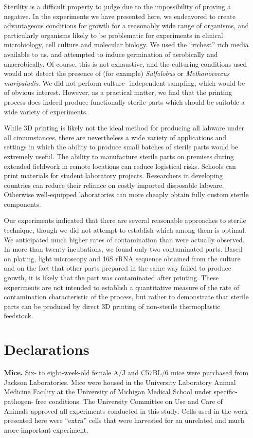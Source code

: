 \documentclass[fleqn,10pt]{wlpeerj}
\begin{document}
Sterility is a difficult property to judge due to the impossibility of proving
a negative. In the experiments we have presented here, we endeavored to create
advantageous conditions for growth for a reasonably wide range of organisms,
and particularly organisms likely to be problematic for experiments in
clinical microbiology, cell culture and molecular biology. We used the
``richest'' rich media available to us, and attempted to induce germination of
aerobically and anaerobically. Of course, this is not exhaustive, and  the
culturing conditions used would not detect the presence of (for example) {\em
Sulfolobus} or {\em Methanococcus maripaludis}. We did not perform culture-
independent sampling, which would be of obvious interest. However, as a
practical matter, we find that the printing process does indeed produce
functionally sterile parts which should be suitable a wide variety of
experiments.

While 3D printing is likely not the ideal method for producing all labware
under all circumstances, there are nevertheless a wide variety of applications
and settings in which the ability to produce small batches of sterile parts
would be extremely useful. The ability to manufacture sterile parts on
premises during extended fieldwork in remote locations can reduce logistical
risks. Schools can print materials for student laboratory projects.
Researchers in developing countries can reduce their reliance on costly
imported disposable labware. Otherwise well-equipped laboratories can more
cheaply obtain fully custom sterile components.

Our experiments indicated that there are several reasonable approaches to
sterile technique, though we did not attempt to establish which among them is
optimal. We anticipated much higher rates of contamination than were actually
observed. In more than twenty incubations, we found only two contaminated
parts. Based on plating, light microscopy and 16S rRNA sequence obtained from
the culture and on the fact that other parts prepared in the same way failed
to produce growth, it is likely that the part was contaminated after printing.
These experiments are not intended to establish a quantitative measure of the
rate of contamination characteristic of the process, but rather to demonstrate
that sterile parts can be produced by direct 3D printing of non-sterile
thermoplastic feedstock.

\section{Declarations}

{\bf Mice.} Six- to eight-week-old female A/J and C57BL/6 mice were purchased
from Jackson Laboratories. Mice were housed in the University Laboratory
Animal Medicine Facility at the University of Michigan Medical School under
specific-pathogen- free conditions. The University Committee on Use and Care
of Animals approved all experiments conducted in this study. Cells used in the
work presented here were ``extra'' cells that were harvested for an unrelated
and much more important experiment.



\end{document}
